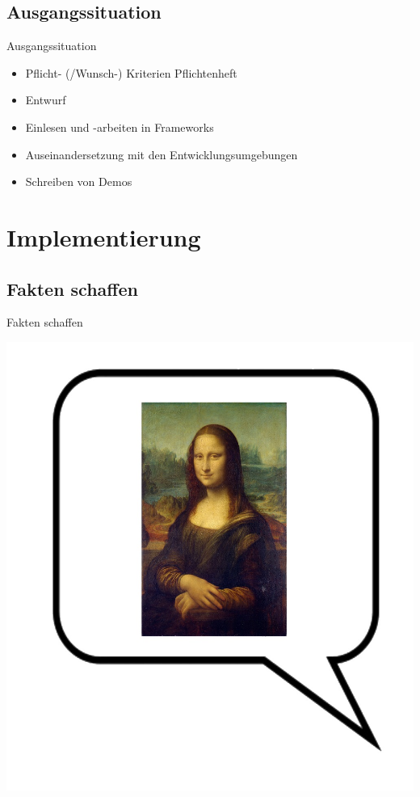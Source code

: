 \documentclass[19pt]{beamer}
\begin{document}
\subsection{Ausgangssituation}
\begin{frame}{Ausgangssituation}
	\begin{itemize}
		\item Pflicht- (/Wunsch-) Kriterien Pflichtenheft
		\pause
		\item Entwurf
		\pause
		\item Einlesen und -arbeiten in Frameworks
		\pause
		\item Auseinandersetzung mit den Entwicklungsumgebungen
		\pause
		\item Schreiben von Demos
	\end{itemize}
\end{frame}

\section{Implementierung}

\subsection{Fakten schaffen}
\begin{frame}{Fakten schaffen}
\begin{center}
\includegraphics[scale=0.2]{resources/start2.jpg}
\end{center}
\end{frame}
\end{document}
